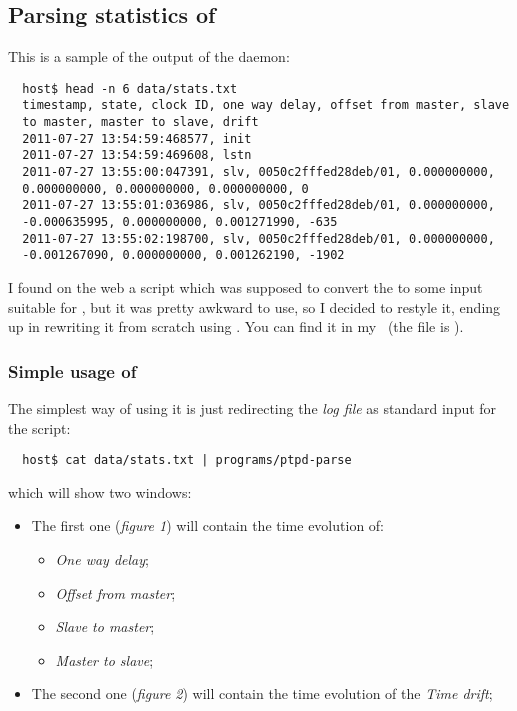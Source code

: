     \subsection{ Parsing statistics of \PTPd }

        This is a sample of the output of the daemon:
\begin{lstlisting}
  host$ head -n 6 data/stats.txt
  timestamp, state, clock ID, one way delay, offset from master, slave
  to master, master to slave, drift
  2011-07-27 13:54:59:468577, init
  2011-07-27 13:54:59:469608, lstn
  2011-07-27 13:55:00:047391, slv, 0050c2fffed28deb/01, 0.000000000,
  0.000000000, 0.000000000, 0.000000000, 0
  2011-07-27 13:55:01:036986, slv, 0050c2fffed28deb/01, 0.000000000,
  -0.000635995, 0.000000000, 0.001271990, -635
  2011-07-27 13:55:02:198700, slv, 0050c2fffed28deb/01, 0.000000000,
  -0.001267090, 0.000000000, 0.001262190, -1902
\end{lstlisting}

        I found on the web a  script which was supposed
        to convert the  to some input suitable for
        , but it was pretty awkward to use, so I decided
        to restyle it, ending up in rewriting it from scratch using
        . You can find it in my \MyRepo\ (the file is
        ).

        \subsubsection{Simple usage of }

            The simplest way of using it is just redirecting the \emph{log
            file} as standard input for the script:
\begin{lstlisting}
  host$ cat data/stats.txt | programs/ptpd-parse
\end{lstlisting}
            which will show two windows:
            \begin{itemize}
            \item   The first one (\emph{figure 1}) will contain the time
                    evolution of:
                \begin{itemize}
                \item   \emph{One way delay};
                \item   \emph{Offset from master};
                \item   \emph{Slave to master};
                \item   \emph{Master to slave};
                \end{itemize}
            \item   The second one (\emph{figure 2}) will contain the time
                    evolution of the \emph{Time drift};
            \end{itemize}

